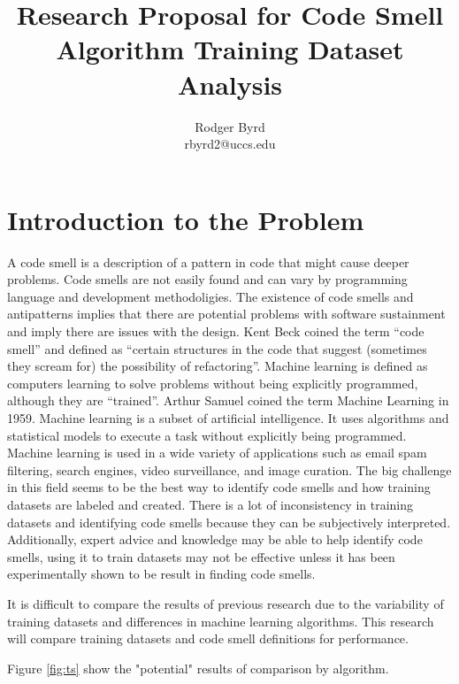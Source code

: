 \documentclass[conference]{IEEEtran}
\begin{document}

\title{Research Proposal for Code Smell Algorithm Training Dataset Analysis}
\author{Rodger Byrd\\rbyrd2@uccs.edu}
\maketitle



\section{Introduction to the Problem}
A code smell is a description of a pattern in code that might cause deeper problems. 
Code smells are not easily found and can vary by programming language and development methodoligies.
The existence of code smells and antipatterns implies that there are potential problems with software sustainment and imply there are issues with the design.
Kent Beck coined the term ``code smell'' \cite{fowler_refactoring:_2018} and defined as ``certain structures in the code that suggest (sometimes they scream for) the possibility of refactoring''.
Machine learning is defined as computers learning to solve problems without being explicitly programmed, although they are ``trained''\cite{bishop_pattern_2006}. 
Arthur Samuel coined the term Machine Learning in 1959\cite{samuel_studies_1988}.
Machine learning is a subset of artificial intelligence. 
It uses algorithms and statistical models to execute a task without explicitly being programmed.
Machine learning is used in a wide variety of applications such as email spam filtering, search engines, video surveillance, and image curation.
The big challenge in this field seems to be the best way to identify code smells and how training datasets are labeled and created.
There is a lot of inconsistency in training datasets and identifying code smells because they can be subjectively interpreted.
Additionally, expert advice and knowledge may be able to help identify code smells, using it to train datasets may not be effective unless it has been experimentally shown to be result in finding code smells. 

It is difficult to compare the results of previous research due to the variability of training datasets and differences in machine learning algorithms.
This research will compare training datasets and code smell definitions for performance.

Figure \ref{fig:ts} show the "potential" results of comparison by algorithm. 
\end{document}
